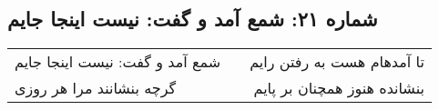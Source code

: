 \begin{center}
\section*{شماره ۲۱: شمع آمد و گفت: نیست اینجا جایم}
\label{sec:021}
\begin{longtable}{l p{0.5cm} r}
شمع آمد و گفت: نیست اینجا جایم
&&
تا آمدهام هست به رفتن رایم
\\
گرچه بنشانند مرا هر روزی
&&
بنشانده هنوز همچنان بر پایم
\\
\end{longtable}
\end{center}
